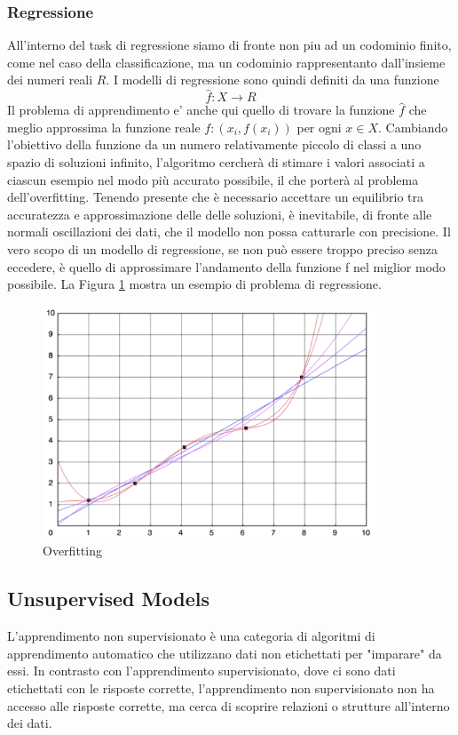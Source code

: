 \subsubsection{Regressione}
All'interno del task di regressione siamo di fronte non piu ad un codominio finito, come nel caso della classificazione, ma un codominio rappresentanto dall'insieme dei numeri reali \(R\). I modelli di regressione sono quindi definiti da una funzione
\[\hat{f}: X \rightarrow R\]
Il problema di apprendimento e' anche qui quello di trovare la funzione \(\hat{f}\) che meglio approssima la funzione reale \(f: (x_i, f(x_i))\) per ogni \(x\in X\).
Cambiando l'obiettivo della funzione da un numero relativamente piccolo di classi
a uno spazio di soluzioni infinito, l'algoritmo cercherà di stimare i valori associati a ciascun esempio nel modo più accurato possibile, il che porterà al problema dell'overfitting. Tenendo presente che è necessario accettare un equilibrio tra accuratezza e approssimazione delle delle soluzioni, è inevitabile, di fronte alle normali oscillazioni dei dati, che il modello non possa catturarle con precisione. Il vero scopo di un modello di regressione, se non può essere troppo preciso senza eccedere, è quello di approssimare l'andamento della funzione f nel miglior modo possibile. La Figura \ref{overfitting} mostra un esempio di problema di regressione.

\begin{figure}[t]
		
	\centering
	\includegraphics[width=10cm, scale=1]{images/overfitting}
	\caption{Overfitting}
	\label{overfitting}
\end{figure}


\subsection{Unsupervised Models}
L'apprendimento non supervisionato è una categoria di algoritmi di apprendimento automatico che utilizzano dati non etichettati per "imparare" da essi. In contrasto con l'apprendimento supervisionato, dove ci sono dati etichettati con le risposte corrette, l'apprendimento non supervisionato non ha accesso alle risposte corrette, ma cerca di scoprire relazioni o strutture all'interno dei dati.

